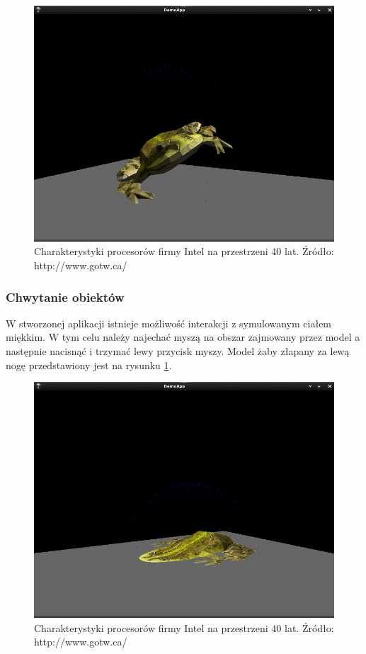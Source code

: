 \begin{figure}[H]
\centering
\label{demo4}
\includegraphics[scale=0.5]{images/z3.jpg}
\caption{Charakterystyki procesorów firmy Intel na przestrzeni 40 lat. Źródło: http://www.gotw.ca/}
\end{figure}

\subsubsection{Chwytanie obiektów}
W stworzonej aplikacji istnieje możliwość interakcji z symulowanym ciałem
miękkim. W tym celu należy najechać myszą na obszar zajmowany przez model a
następnie nacisnąć i trzymać lewy przycisk myszy. Model żaby złapany za lewą
nogę przedstawiony jest na rysunku \ref{demo4}.

\begin{figure}[H]
\label{demo5}
\centering
\includegraphics[scale=0.5]{images/z5.jpg}
\caption{Charakterystyki procesorów firmy Intel na przestrzeni 40 lat. Źródło: http://www.gotw.ca/}
\end{figure}

